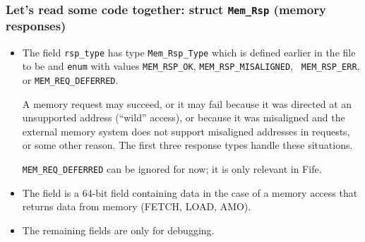 \begin{frame}[fragile]
\frametitle{Let's read some code together: struct {\tt Mem\_Rsp} (memory responses)}

\begin{center}\scriptsize


 \vspace*{5ex}

 \begin{minipage}{0.8\textwidth}
  \begin{itemize}

   \item The field {\tt rsp\_type} has type {\tt Mem\_Rsp\_Type} which
     is defined earlier in the file to be and {\tt enum} with values
     {\tt MEM\_RSP\_OK}, {\tt MEM\_RSP\_MISALIGNED}, {\tt
     MEM\_RSP\_ERR}, or {\tt MEM\_REQ\_DEFERRED}.

     \vspace{1ex}

     A memory request may succeed, or it may fail because it was
     directed at an unsupported address (``wild'' access), or because
     it was misaligned and the external memory system does not support
     misaligned addresses in requests, or some other reason.  The
     first three response types handle these situations.

     \vspace{1ex}

     {\tt MEM\_REQ\_DEFERRED} can be ignored for now; it is only
     relevant in Fife.

   \item The field  is a 64-bit field containing data in the
   case of a memory access that returns data from memory (FETCH, LOAD,
   AMO).

   \item The remaining fields are only for debugging.

  \end{itemize}

 \end{minipage}
\end{center}

\end{frame}

